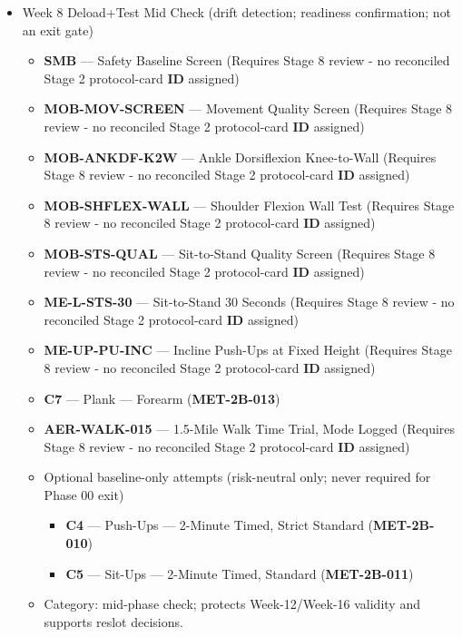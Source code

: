 \documentclass[10pt]{article}
\begin{document}
\begin{itemize}
\item Week 8 Deload+Test Mid Check (drift detection; readiness confirmation; not an exit gate)
  \begin{itemize}
  \item \textbf{SMB} — Safety Baseline Screen (Requires Stage 8 review - no reconciled Stage 2 protocol-card \textbf{ID} assigned)
  \item \textbf{MOB-MOV-SCREEN} — Movement Quality Screen (Requires Stage 8 review - no reconciled Stage 2 protocol-card \textbf{ID} assigned)
  \item \textbf{MOB-ANKDF-K2W} — Ankle Dorsiflexion Knee-to-Wall (Requires Stage 8 review - no reconciled Stage 2 protocol-card \textbf{ID} assigned)
  \item \textbf{MOB-SHFLEX-WALL} — Shoulder Flexion Wall Test (Requires Stage 8 review - no reconciled Stage 2 protocol-card \textbf{ID} assigned)
  \item \textbf{MOB-STS-QUAL} — Sit-to-Stand Quality Screen (Requires Stage 8 review - no reconciled Stage 2 protocol-card \textbf{ID} assigned)
  \item \textbf{ME-L-STS-30} — Sit-to-Stand 30 Seconds (Requires Stage 8 review - no reconciled Stage 2 protocol-card \textbf{ID} assigned)
  \item \textbf{ME-UP-PU-INC} — Incline Push-Ups at Fixed Height (Requires Stage 8 review - no reconciled Stage 2 protocol-card \textbf{ID} assigned)
  \item \textbf{C7} — Plank — Forearm (\textbf{MET-2B-013})
  \item \textbf{AER-WALK-015} — 1.5-Mile Walk Time Trial, Mode Logged (Requires Stage 8 review - no reconciled Stage 2 protocol-card \textbf{ID} assigned)
  \item Optional baseline-only attempts (risk-neutral only; never required for Phase 00 exit)
    \begin{itemize}
    \item \textbf{C4} — Push-Ups — 2-Minute Timed, Strict Standard (\textbf{MET-2B-010})
    \item \textbf{C5} — Sit-Ups — 2-Minute Timed, Standard (\textbf{MET-2B-011})
    \end{itemize}
  \item Category: mid-phase check; protects Week-12/Week-16 validity and supports reslot decisions.
  \end{itemize}


\end{itemize}
\end{document}
